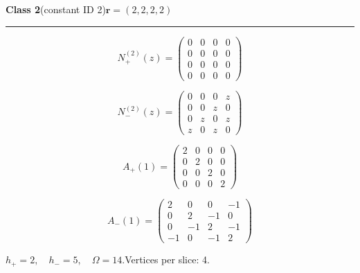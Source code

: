 \noindent\begin{minipage}{\linewidth}
\noindent\textbf{Class 2}\quad\small (constant ID 2)\hfill $\symbf{r}=(2,2,2,2)$
\par\smallskip\noindent\textcolor{rulegray}{\rule{\linewidth}{0.3pt}}
\begin{minipage}[c]{0.495\linewidth}\centering\fontsize{9.7}{12}\selectfont
\setlength{\abovedisplayskip}{4pt}\setlength{\belowdisplayskip}{4pt}
\setlength{\abovedisplayshortskip}{4pt}\setlength{\belowdisplayshortskip}{4pt}
\setlength{\arraycolsep}{3pt}\renewcommand{\arraystretch}{1.08}
\[N_{+}^{(2)}(z)=\begin{pmatrix}0 & 0 & 0 & 0\\0 & 0 & 0 & 0\\0 & 0 & 0 & 0\\0 & 0 & 0 & 0\end{pmatrix}\]
\end{minipage}%
\begin{minipage}[c]{0.495\linewidth}\centering\fontsize{9.7}{12}\selectfont
\setlength{\abovedisplayskip}{4pt}\setlength{\belowdisplayskip}{4pt}
\setlength{\abovedisplayshortskip}{4pt}\setlength{\belowdisplayshortskip}{4pt}
\setlength{\arraycolsep}{3pt}\renewcommand{\arraystretch}{1.08}
\[N_{-}^{(2)}(z)=\begin{pmatrix}0 & 0 & 0 & z\\0 & 0 & z & 0\\0 & z & 0 & z\\z & 0 & z & 0\end{pmatrix}\]
\end{minipage}%
\par\noindent
\begin{minipage}[c]{0.495\linewidth}\centering\fontsize{9.7}{12}\selectfont
\setlength{\abovedisplayskip}{4pt}\setlength{\belowdisplayskip}{4pt}
\setlength{\abovedisplayshortskip}{4pt}\setlength{\belowdisplayshortskip}{4pt}
\setlength{\arraycolsep}{3pt}\renewcommand{\arraystretch}{1.08}
\[A_{+}(1)=\begin{pmatrix}2 & 0 & 0 & 0\\0 & 2 & 0 & 0\\0 & 0 & 2 & 0\\0 & 0 & 0 & 2\end{pmatrix}\]
\end{minipage}%
\begin{minipage}[c]{0.495\linewidth}\centering\fontsize{9.7}{12}\selectfont
\setlength{\abovedisplayskip}{4pt}\setlength{\belowdisplayskip}{4pt}
\setlength{\abovedisplayshortskip}{4pt}\setlength{\belowdisplayshortskip}{4pt}
\setlength{\arraycolsep}{3pt}\renewcommand{\arraystretch}{1.08}
\[A_{-}(1)=\begin{pmatrix}2 & 0 & 0 & -1\\0 & 2 & -1 & 0\\0 & -1 & 2 & -1\\-1 & 0 & -1 & 2\end{pmatrix}\]
\end{minipage}%
\par\smallskip\noindent\small $h_+=2,\quad h_-=5,\quad \Omega=14.$\quad Vertices per slice: 4.
\end{minipage}\par\vfill
\clearpage
